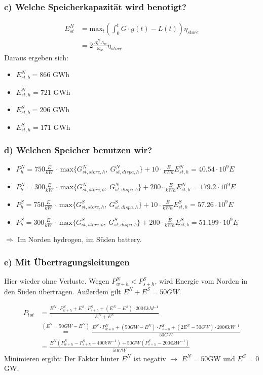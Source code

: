 \documentclass[11pt,a4paper,fleqn]{scrartcl}
\begin{document}
\begin{enumerate}[(a)]
 \subsubsection*{c) Welche Speicherkapazit\"at wird benotigt?}
 
 \begin{align*}
       E_{st}^N &= \mathrm{max}_t \left( \int_0^t G\cdot g(t) - L(t) \right) \eta_{store} \\
       &= 2\frac{A_l^N A_w}{\omega_w} \eta_{store}
 \end{align*}
 Daraus ergeben sich:
 \begin{itemize}
       \item $E_{st,b}^N = 866$ GWh
       \item $E_{st,h}^N = 721$ GWh
       \item $E_{st,b}^S = 206$ GWh
       \item $E_{st,h}^S = 171$ GWh
 \end{itemize}
 \subsubsection*{d) Welchen Speicher benutzen wir?}
 \begin{itemize}
       \item $P_h^N = 750\frac{E}{kW}$ $\cdot$ $\mathrm{max}\{G_{st,store,h}^N,\ G_{st,dispa,h}^N\}+10\cdot\frac{E}{kWh} E_{st,h}^N = 40.54\cdot10^9E$
       \item $P_b^N = 300\frac{E}{kW}$ $\cdot$ $\mathrm{max}\{G_{st,store,b}^N,\ G_{st,dispa,b}^N\}+200\cdot\frac{E}{kWh} E_{st,b}^N = 179.2\cdot10^9E$
       \item $P_h^S = 750\frac{E}{kW}$ $\cdot$ $\mathrm{max}\{G_{st,store,h}^S,\ G_{st,dispa,h}^S\}+10\cdot\frac{E}{kWh} E_{st,h}^S = 57.26\cdot10^9E$
       \item $P_b^S = 300\frac{E}{kW}$ $\cdot$ $\mathrm{max}\{G_{st,store,b}^S,\ G_{st,dispa,b}^S\}+200\cdot\frac{E}{kWh} E_{st,b}^S = 51.199\cdot10^9E$
 \end{itemize}
 $\Rightarrow$ Im Norden hydrogen, im S\"uden battery.
 
 \subsubsection*{e) Mit \"Ubertragungsleitungen}
 Hier wieder ohne Verluste.
 Wegen $P^N_{w+h} < P_{s+h}^S$, wird Energie vom Norden in den Süden übertragen. Außerdem gilt $E^N+E^S=50GW$.
 
 \begin{align*}
       P_{tot} &= \frac{E^N\cdot P^N_{w+h} + E^S\cdot P_{s+h}^S + (E^N-E^S)\cdot 200 \euro kM^{-1}}{E^N+E^S} \\
       &\overset{(E^S=50GW-E^N)}{=} \frac{E^N\cdot P^N_{w+h}+(50GW-E^N)\cdot P^S_{s+h}+(2E^N-50GW)\cdot 200\euro kW^{-1}}{50GW} \\
       &= \frac{E^N(P^N_{w+h}-P^S_{s+h}+400kW^{-1})+50GW(P^S_{s+h}-200\euro kW^{-1})}{50GW}
 \end{align*}
 Minimieren ergibt: Der Faktor hinter $E^N$ ist negativ $\rightarrow$ $E^N=50$GW und $E^S=0$GW.
 

\end{enumerate}
\end{document}

